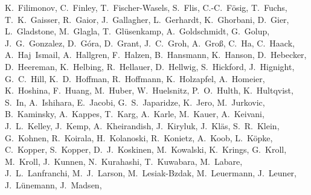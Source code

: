\documentclass[manuscript]{aastex}
\begin{document}
{K.~Filimonov,
C.~Finley,
T.~Fischer-Wasels,
S.~Flis,
C.-C.~F\"osig,
T.~Fuchs,
T.~K.~Gaisser,
R.~Gaior,
J.~Gallagher,
L.~Gerhardt,
K.~Ghorbani,
D.~Gier,
L.~Gladstone,
M.~Glagla,
T.~Gl\"usenkamp,
A.~Goldschmidt,
G.~Golup,
J.~G.~Gonzalez,
D.~G\'ora,
D.~Grant,
J.~C.~Groh,
A.~Gro{\ss},
C.~Ha,
C.~Haack,
A.~Haj~Ismail,
A.~Hallgren,
F.~Halzen,
B.~Hansmann,
K.~Hanson,
D.~Hebecker,
D.~Heereman,
K.~Helbing,
R.~Hellauer,
D.~Hellwig,
S.~Hickford,
J.~Hignight,
G.~C.~Hill,
K.~D.~Hoffman,
R.~Hoffmann,
K.~Holzapfel,
A.~Homeier,
K.~Hoshina,
F.~Huang,
M.~Huber,
W.~Huelsnitz,
P.~O.~Hulth,
K.~Hultqvist,
S.~In,
A.~Ishihara,
E.~Jacobi,
G.~S.~Japaridze,
K.~Jero,
M.~Jurkovic,
B.~Kaminsky,
A.~Kappes,
T.~Karg,
A.~Karle,
M.~Kauer,
A.~Keivani,
J.~L.~Kelley,
J.~Kemp,
A.~Kheirandish,
J.~Kiryluk,
J.~Kl\"as,
S.~R.~Klein,
G.~Kohnen,
R.~Koirala,
H.~Kolanoski,
R.~Konietz,
A.~Koob,
L.~K\"opke,
C.~Kopper,
S.~Kopper,
D.~J.~Koskinen,
M.~Kowalski,
K.~Krings,
G.~Kroll,
M.~Kroll,
J.~Kunnen,
N.~Kurahashi,
T.~Kuwabara,
M.~Labare,
J.~L.~Lanfranchi,
M.~J.~Larson,
M.~Lesiak-Bzdak,
M.~Leuermann,
J.~Leuner,
J.~L\"unemann,
J.~Madsen,
}
\end{document}
